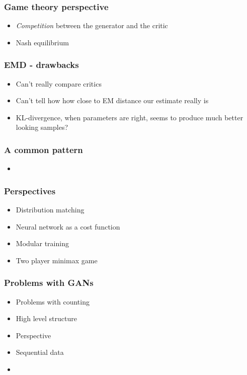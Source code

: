 \documentclass{beamer}
\begin{document}
\begin{frame}
	\frametitle{Game theory perspective}
	\begin{itemize}
		\item \textit{Competition} between the generator and the critic
		\item Nash equilibrium
	\end{itemize}
\end{frame}

\begin{frame}
	\frametitle{EMD - drawbacks}
	\begin{itemize}
		\item Can't really compare critics
		\item Can't tell how how close to EM distance our estimate really is
		\item KL-divergence, when parameters are right, seems to produce much better looking samples?
	\end{itemize}
\end{frame}

\begin{frame}
	\frametitle{A common pattern}
	\begin{itemize}
		\item
	\end{itemize}
\end{frame}
\begin{frame}
\frametitle{Perspectives}
\begin{itemize}
	\item Distribution matching
	\item Neural network as a cost function
	\item Modular training
	\item Two player minimax game
\end{itemize}
\end{frame}


\begin{frame}
	\frametitle{Problems with GANs}
	\begin{itemize}
		\item Problems with counting
		\item High level structure
		\item Perspective
		\item Sequential data
		\item 
	\end{itemize}
\end{frame}
\end{document}
